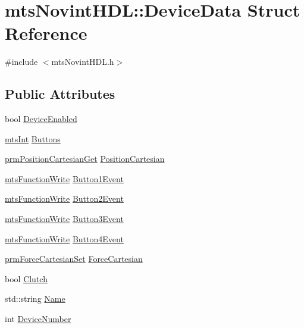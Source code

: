 \hypertarget{structmts_novint_h_d_l_1_1_device_data}{\section{mts\-Novint\-H\-D\-L\-:\-:Device\-Data Struct Reference}
\label{structmts_novint_h_d_l_1_1_device_data}
}


{\ttfamily \#include $<$mts\-Novint\-H\-D\-L.\-h$>$}

\subsection*{Public Attributes}
\begin{DoxyCompactItemize}
\item 
bool \hyperlink{structmts_novint_h_d_l_1_1_device_data_afb160710dea5b05f05d1aab53d92336f}{Device\-Enabled}
\item 
\hyperlink{mts_generic_object_proxy_8h_a24374d6f6591267740de73ba87c08d4e}{mts\-Int} \hyperlink{structmts_novint_h_d_l_1_1_device_data_ac44990640b586d8a73e6f75d7c009ca9}{Buttons}
\item 
\hyperlink{classprm_position_cartesian_get}{prm\-Position\-Cartesian\-Get} \hyperlink{structmts_novint_h_d_l_1_1_device_data_ac93b06cca79ba9eeb52df9d2f0931276}{Position\-Cartesian}
\item 
\hyperlink{classmts_function_write}{mts\-Function\-Write} \hyperlink{structmts_novint_h_d_l_1_1_device_data_a59318180ca7f85b1f17fa587d123b432}{Button1\-Event}
\item 
\hyperlink{classmts_function_write}{mts\-Function\-Write} \hyperlink{structmts_novint_h_d_l_1_1_device_data_a0f3d63effcb0c47a8936f07bc2cb21ba}{Button2\-Event}
\item 
\hyperlink{classmts_function_write}{mts\-Function\-Write} \hyperlink{structmts_novint_h_d_l_1_1_device_data_a82bf93fa265ffd336ae0c9947cf5fec1}{Button3\-Event}
\item 
\hyperlink{classmts_function_write}{mts\-Function\-Write} \hyperlink{structmts_novint_h_d_l_1_1_device_data_afb4f5d57acac4ff03d0e6c7ce0f8c637}{Button4\-Event}
\item 
\hyperlink{classprm_force_cartesian_set}{prm\-Force\-Cartesian\-Set} \hyperlink{structmts_novint_h_d_l_1_1_device_data_a0cdc951bd1b42f4f2d600edf415ba181}{Force\-Cartesian}
\item 
bool \hyperlink{structmts_novint_h_d_l_1_1_device_data_a00c1d32b2e1ae4603014566a61b18eb6}{Clutch}
\item 
std\-::string \hyperlink{structmts_novint_h_d_l_1_1_device_data_a680dd117f9b6f0b13ef2142d72c507ff}{Name}
\item 
int \hyperlink{structmts_novint_h_d_l_1_1_device_data_a9bd1b2ab0ac17be34d64b2ad1de156a2}{Device\-Number}
\end{DoxyCompactItemize}


